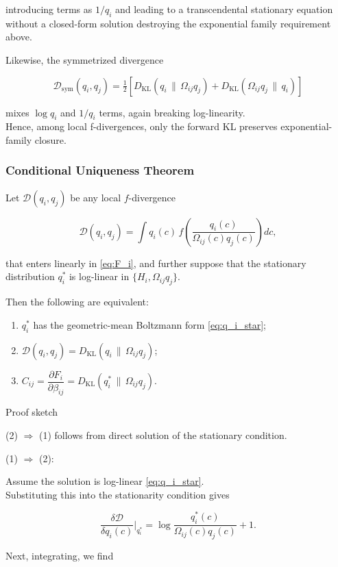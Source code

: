 \documentclass[11pt]{article}
\begin{document}
introducing terms as $1/q_i$ and leading to a transcendental stationary equation without a closed-form solution destroying the exponential family requirement above.

Likewise, the symmetrized divergence

\[
\mathcal{D}_{\mathrm{sym}}(q_i,q_j)
= \tfrac{1}{2}\!\left[
D_{\mathrm{KL}}(q_i \,\|\, \Omega_{ij} q_j)
+ D_{\mathrm{KL}}(\Omega_{ij} q_j \,\|\, q_i)
\right]
\]

mixes $\log q_i$ and $1/q_i$ terms, again breaking log-linearity.\\
Hence, among local f-divergences, only the forward KL preserves exponential-family closure.

\subsubsection{Conditional Uniqueness Theorem}
Let $\mathcal{D}(q_i,q_j)$ be any local $f$-divergence

\[
\mathcal{D}(q_i,q_j)
= \int q_i(c)\,
f\!\left(\frac{q_i(c)}{\Omega_{ij}(c) q_j(c)}\right)
dc,
\]

that enters linearly in \eqref{eq:F_i}, and further suppose that the stationary distribution $q_i^*$ is log-linear in $\{H_i,\Omega_{ij}q_j\}$.

Then the following are equivalent:

\begin{enumerate}
  \item $q_i^*$ has the geometric-mean Boltzmann form \eqref{eq:q_i_star};
  \item $\mathcal{D}(q_i,q_j)=D_{\mathrm{KL}}(q_i \,\|\, \Omega_{ij} q_j)$;
  \item $C_{ij}=\dfrac{\partial F_i}{\partial\beta_{ij}}
=D_{\mathrm{KL}}(q_i^* \,\|\, \Omega_{ij}q_j).$
\end{enumerate}

Proof sketch

(2) $\Rightarrow$ (1) follows from direct solution of the stationary condition.

(1) $\Rightarrow$ (2):

Assume the solution is log-linear \eqref{eq:q_i_star}.\\
Substituting this into the stationarity condition gives

\[
\frac{\delta \mathcal{D}}{\delta q_i(c)}
\Big|_{q_i^*}
= \log\frac{q_i^*(c)}{\Omega_{ij}(c) q_j(c)} + 1.
\]

Next, integrating, we find
\end{document}

